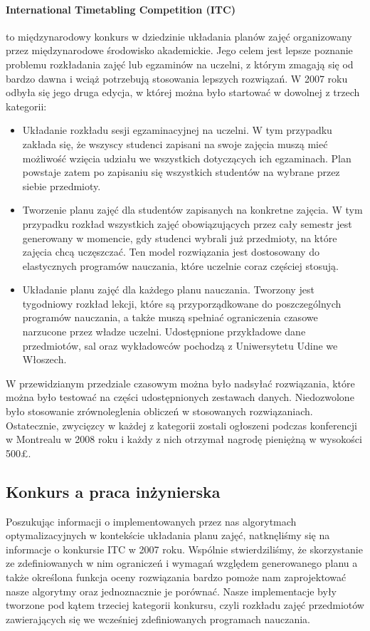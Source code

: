 \paragraph{International Timetabling Competition (ITC)}\cite{itc} to międzynarodowy konkurs w dziedzinie układania planów zajęć organizowany przez międzynarodowe środowisko akademickie. Jego celem jest lepsze poznanie problemu rozkładania zajęć lub egzaminów na uczelni, z którym zmagają się od bardzo dawna i wciąż potrzebują stosowania lepszych rozwiązań. W 2007 roku odbyła się jego druga edycja, w której można było startować w dowolnej z trzech kategorii: 
\begin{itemize}
\item Układanie rozkładu sesji egzaminacyjnej na uczelni. W tym przypadku zakłada się, że wszyscy studenci zapisani na swoje zajęcia muszą mieć możliwość wzięcia udziału we wszystkich dotyczących ich egzaminach. Plan powstaje zatem po zapisaniu się wszystkich studentów na wybrane przez siebie przedmioty.
\item Tworzenie planu zajęć dla studentów zapisanych na konkretne zajęcia. W tym przypadku rozkład wszystkich zajęć obowiązujących przez cały semestr jest generowany w momencie, gdy studenci wybrali już przedmioty, na które zajęcia chcą uczęszczać. Ten model rozwiązania jest dostosowany do elastycznych programów nauczania, które uczelnie coraz częściej stosują.
\item Układanie planu zajęć dla każdego planu nauczania. Tworzony jest tygodniowy rozkład lekcji, które są przyporządkowane do poszczególnych programów nauczania, a także muszą spełniać ograniczenia czasowe narzucone przez władze uczelni. Udostępnione przykładowe dane przedmiotów, sal oraz wykładowców pochodzą z Uniwersytetu Udine we Włoszech.
\end{itemize}
W przewidzianym przedziale czasowym można było nadsyłać rozwiązania, które można było testować na części udostępnionych zestawach danych. Niedozwolone było stosowanie zrównoleglenia obliczeń w stosowanych rozwiązaniach. Ostatecznie, zwycięzcy w każdej z kategorii zostali ogłoszeni podczas konferencji w Montrealu w 2008 roku i każdy z nich otrzymał nagrodę pieniężną w wysokości 500\pounds .
\subsection{Konkurs a praca inżynierska}
\par Poszukując informacji o implementowanych przez nas algorytmach optymalizacyjnych w kontekście układania planu zajęć, natknęliśmy się na informacje o konkursie ITC w 2007 roku. Wspólnie stwierdziliśmy, że skorzystanie ze zdefiniowanych w nim ograniczeń i wymagań względem generowanego planu a także określona funkcja oceny rozwiązania bardzo pomoże nam zaprojektować nasze algorytmy oraz jednoznacznie je porównać. Nasze implementacje były tworzone pod kątem trzeciej kategorii konkursu, czyli rozkładu zajęć przedmiotów zawierających się we wcześniej zdefiniowanych programach nauczania.
